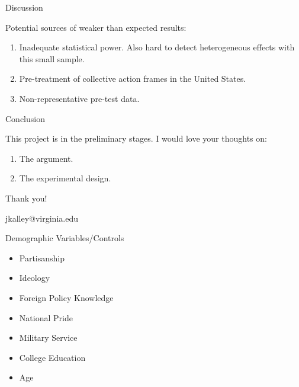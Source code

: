 \documentclass[12pt]{beamer}
\begin{document}


\begin{frame}{Discussion}

Potential sources of weaker than expected results:

\pause
\begin{enumerate}
\item Inadequate statistical power. \pause Also hard to detect heterogeneous effects with this small sample.  
\pause 
\item Pre-treatment of collective action frames in the United States. 
\pause
\item Non-representative pre-test data.
\end{enumerate} 

\end{frame}



\begin{frame}{Conclusion}

This project is in the preliminary stages. I would love your thoughts on:

\pause
\begin{enumerate}
\item The argument. 
\pause
\item The experimental design. 
\end{enumerate}


\end{frame}




\begin{frame}[standout]

Thank you! 

jkalley@virginia.edu

\end{frame}


\appendix 


\begin{frame}{Demographic Variables/Controls}

\begin{itemize}
\item Partisanship
\item Ideology
\item Foreign Policy Knowledge
\item National Pride 
\item Military Service
\item College Education
\item Age
\end{itemize} 

\end{frame}
\end{document}
